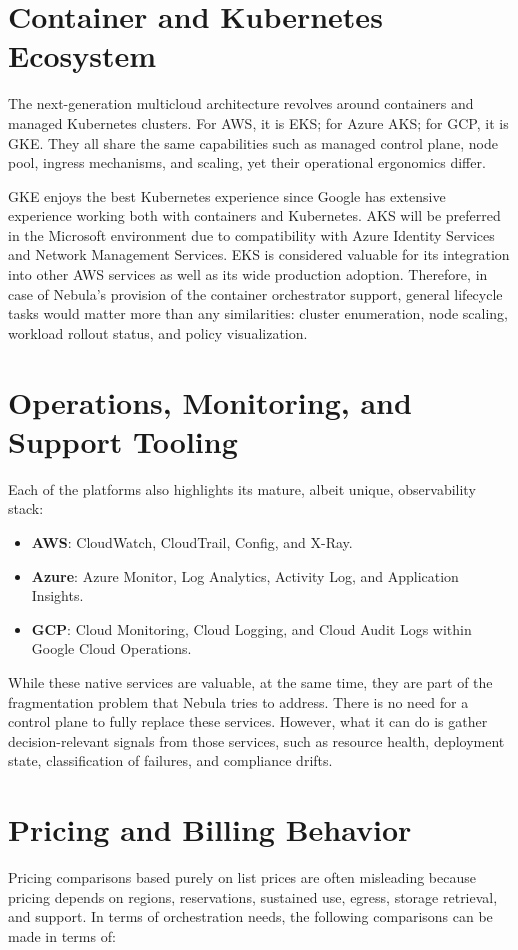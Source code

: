 \section{Container and Kubernetes Ecosystem}
The next-generation multicloud architecture revolves around containers and managed Kubernetes clusters. For AWS, it is EKS; for Azure AKS; for GCP, it is GKE. They all share the same capabilities such as managed control plane, node pool, ingress mechanisms, and scaling, yet their operational ergonomics differ.


GKE enjoys the best Kubernetes experience since Google has extensive experience working both with containers and Kubernetes. AKS will be preferred in the Microsoft environment due to compatibility with Azure Identity Services and Network Management Services. EKS is considered valuable for its integration into other AWS services as well as its wide production adoption. Therefore, in case of Nebula's provision of the container orchestrator support, general lifecycle tasks would matter more than any similarities: cluster enumeration, node scaling, workload rollout status, and policy visualization.


\section{Operations, Monitoring, and Support Tooling}
Each of the platforms also highlights its mature, albeit unique, observability stack:

\begin{itemize}
    \item \textbf{AWS}: CloudWatch, CloudTrail, Config, and X-Ray.
    \item \textbf{Azure}: Azure Monitor, Log Analytics, Activity Log, and Application Insights.
    \item \textbf{GCP}: Cloud Monitoring, Cloud Logging, and Cloud Audit Logs within Google Cloud Operations.
\end{itemize}


While these native services are valuable, at the same time, they are part of the fragmentation problem that Nebula tries to address. There is no need for a control plane to fully replace these services. However, what it can do is gather decision-relevant signals from those services, such as resource health, deployment state, classification of failures, and compliance drifts.

\section{Pricing and Billing Behavior}
Pricing comparisons based purely on list prices are often misleading because pricing depends on regions, reservations, sustained use, egress, storage retrieval, and support. In terms of orchestration needs, the following comparisons can be made in terms of:

